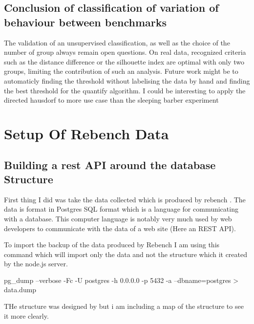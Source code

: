 \documentclass{article}
\begin{document}
\subsection{Conclusion of classification of variation of behaviour between benchmarks}

The validation of an unsupervised classification, as well as the choice of the number of group always remain open questions. On real data, recognized criteria such as the distance difference or the silhouette index are optimal with only two groups, limiting the contribution of such an analysis.
Future work might be to automaticly finding the threshold without labelising the data by hand and finding the best threshold for the quantify algorithm.
I could be interesting to apply the directed hausdorf to more use case than the sleeping barber experiment



\section{Setup Of Rebench Data}

\subsection{Building a rest API around the database Structure}

First thing I did was take the data collected  which is produced by rebench \cite{ReBench:2018}. The data is format in Postgres SQL format which is a language for communicating with a database. This computer language is notably very much used by web developers to communicate with the data of a web site (Here an REST API).

To import the backup of the data produced by Rebench I am using this command which will import only the data and not the structure which it created by the node.js server.

\begin{python}[h!]
pg_dump --verbose -Fc -U postgres -h 0.0.0.0 -p 5432  -a --dbname=postgres > data.dump
\end{python}

THe structure was designed by \cite{ReBench:2018} but i am including a map of the structure to see it more clearly.
\end{document}
